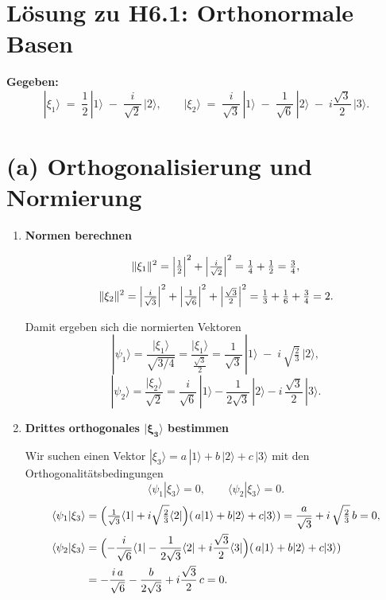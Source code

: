 \documentclass[11pt]{scrartcl}
\begin{document}
\section*{Lösung zu H6.1: Orthonormale Basen}

\textbf{Gegeben:}
\[
|\xi_1\rangle \;=\;\frac12\,|1\rangle \;-\;\frac{i}{\sqrt2}\,|2\rangle,
\qquad
|\xi_2\rangle \;=\;\frac{i}{\sqrt3}\,|1\rangle \;-\;\frac{1}{\sqrt6}\,|2\rangle
\;-\;i\frac{\sqrt3}{2}\,|3\rangle.
\]

\bigskip

\section*{(a) Orthogonalisierung und Normierung}

\begin{enumerate}[label=\arabic*)]
  \item \textbf{Normen berechnen}

    \[
      \|\xi_1\|^2
      = \Bigl|\tfrac12\Bigr|^2 + \Bigl|\tfrac{i}{\sqrt2}\Bigr|^2
      = \tfrac14 + \tfrac12 = \tfrac34,
    \]
    \[
      \|\xi_2\|^2
      = \Bigl|\tfrac{i}{\sqrt3}\Bigr|^2
      + \Bigl|\tfrac{1}{\sqrt6}\Bigr|^2
      + \Bigl|\tfrac{\sqrt3}{2}\Bigr|^2
      = \tfrac13 + \tfrac16 + \tfrac34 = 2.
    \]

    Damit ergeben sich die normierten Vektoren
    \[
      |\psi_1\rangle = \frac{|\xi_1\rangle}{\sqrt{3/4}}
      = \frac{|\xi_1\rangle}{\tfrac{\sqrt3}{2}}
      = \frac{1}{\sqrt3}\,|1\rangle \;-\; i\,\sqrt{\tfrac23}\,|2\rangle,
    \]
    \[
      |\psi_2\rangle = \frac{|\xi_2\rangle}{\sqrt{2}}
      = \frac{i}{\sqrt6}\,|1\rangle 
        - \frac{1}{2\sqrt3}\,|2\rangle
        - i\,\frac{\sqrt3}{2}\,|3\rangle.
    \]

  \item \textbf{Drittes orthogonales $\boldsymbol{|\xi_3\rangle}$ bestimmen}

    Wir suchen einen Vektor
    \(
      |\xi_3\rangle = a\,|1\rangle + b\,|2\rangle + c\,|3\rangle
    \)
    mit den Orthogonalitätsbedingungen
    \[
      \langle \psi_1|\xi_3\rangle = 0,
      \qquad
      \langle \psi_2|\xi_3\rangle = 0.
    \]
    \begin{align*}
      \langle \psi_1|\xi_3\rangle &= 
        \Bigl(\tfrac{1}{\sqrt3}\langle1| + i\sqrt{\tfrac23}\langle2|\Bigr)
        (\,a|1\rangle + b|2\rangle + c|3\rangle)
      = \frac{a}{\sqrt3} + i\,\sqrt{\tfrac23}\,b = 0,\\
      \langle \psi_2|\xi_3\rangle &= 
        \Bigl(-\frac{i}{\sqrt6}\langle1| - \frac{1}{2\sqrt3}\langle2|
              + i\frac{\sqrt3}{2}\langle3|\Bigr)
        (\,a|1\rangle + b|2\rangle + c|3\rangle)\\
      &= -\frac{i\,a}{\sqrt6} - \frac{b}{2\sqrt3} + i\frac{\sqrt3}{2}\,c = 0.
    \end{align*}


\end{enumerate}
\end{document}

